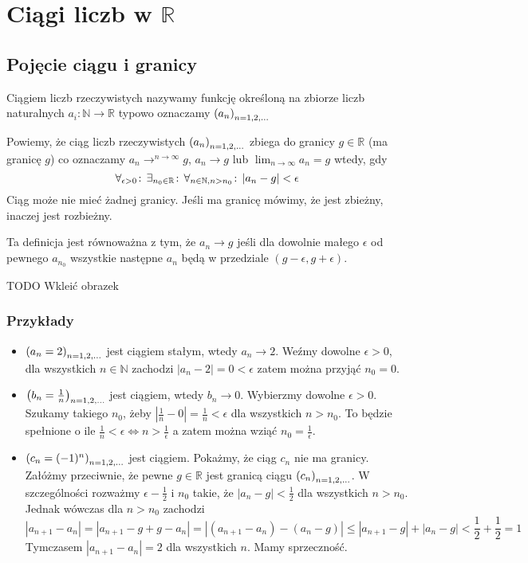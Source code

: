 \documentclass[9pt]{article}
\begin{document}
\section{Ciągi liczb w $\mathbb{R}$}

\subsection{Pojęcie ciągu i granicy}

\begin{Def}
    Ciągiem liczb rzeczywistych nazywamy funkcję określoną na zbiorze liczb naturalnych  $a_i:
    \mathbb{N} \rightarrow \mathbb{R}$ typowo oznaczamy $\left(a_n\right)_{n = 1,2,...}$
\end{Def}

\begin{Def}
    Powiemy, że ciąg liczb rzeczywistych $\left(a_n\right)_{n = 1,2,...}$ zbiega do granicy $g \in \mathbb{R}$ (ma
    granicę $g$) co oznaczamy $a_n \rightarrow^{n\rightarrow \infty} g$, $a_n \rightarrow g$ lub
    $\lim_{n\rightarrow \infty}a_n = g$ wtedy, gdy
    \[
        \forall_{\epsilon > 0} \! : \, \exists_{n_0 \in \mathbb{R}} \! : \, \forall_{n \in \mathbb{N}, n >
        n_0} \! : \, |a_n - g| < \epsilon
    \]
    Ciąg może nie mieć żadnej granicy. Jeśli ma granicę mówimy, że jest zbieżny, inaczej jest
    rozbieżny.
\end{Def}

Ta definicja jest równoważna z tym, że $a_n \rightarrow g$ jeśli dla dowolnie małego $\epsilon$ od
pewnego $a_{n_0}$ wszystkie następne $a_n$ będą w przedziale $(g-\epsilon, g+\epsilon)$.

TODO Wkleić obrazek

\subsubsection*{Przykłady}

\begin{itemize}
    \item $\left(a_n = 2\right)_{n = 1,2,...}$ jest ciągiem stałym, wtedy $a_n \rightarrow 2$. Weźmy dowolne $\epsilon > 0$,
        dla wszystkich $n \in \mathbb{N}$ zachodzi $|a_n - 2| = 0 < \epsilon$ zatem można przyjąć
        $n_0 = 0$.
    \item $\left(b_n = \frac{1}{n}\right)_{n = 1,2,...}$ jest ciągiem, wtedy $b_n \rightarrow 0$. Wybierzmy dowolne $\epsilon
        > 0$. Szukamy takiego $n_0$, żeby $|\frac{1}{n} - 0| = \frac{1}{n} < \epsilon$ dla
        wszystkich $n > n_0$. To będzie spełnione o ile $\frac{1}{n} < \epsilon \iff n >
        \frac{1}{\epsilon}$ a zatem można wziąć $n_0 = \frac{1}{\epsilon}$.
    \item $\left(c_n = (-1)^n\right)_{n = 1,2,...}$ jest ciągiem. Pokażmy, że ciąg $c_n$ nie ma granicy. Załóżmy przeciwnie,
        że pewne $g \in \mathbb{R}$ jest granicą ciągu $\left(c_n\right)_{n = 1,2,...}$. W szczególności rozważmy $\epsilon -
        \frac{1}{2}$ i $n_0$ takie, że $|a_n - g| < \frac{1}{2}$ dla wszystkich $n > n_0$. Jednak
        wówczas dla $n > n_0$ zachodzi
        \[
            |a_{n+1} - a_n| = |a_{n+1}-g+g-a_n| = |(a_{n+1} - a_n) - (a_n-g)| \le |a_{n+1} - g| +
            |a_n - g| < \frac{1}{2} + \frac{1}{2} = 1
        \]
        Tymczasem $|a_{n+1} - a_n| = 2$ dla wszystkich $n$. Mamy sprzeczność.
\end{itemize}
\end{document}
